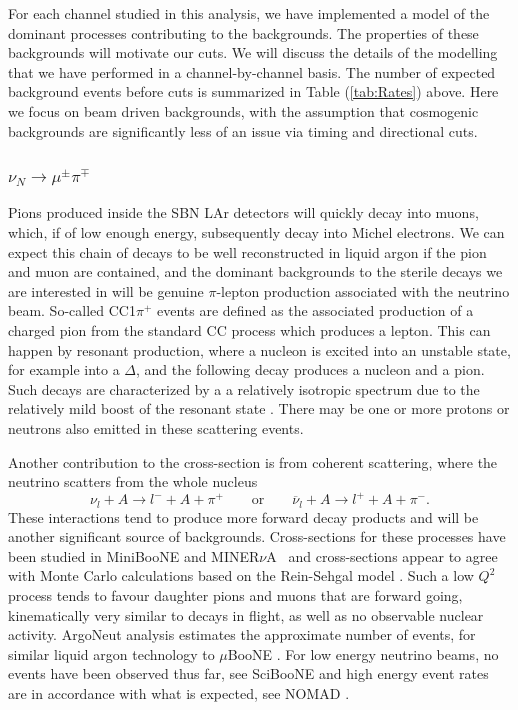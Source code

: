 \documentclass[11pt, a4paper]{article}
\def\minerva{MINER$\nu$A}
\begin{document}
For each channel studied in this analysis, we have implemented a model of the dominant processes contributing to the backgrounds. The properties of these backgrounds will motivate our cuts. We will discuss the details of the modelling that we have performed in a channel-by-channel basis. The number of expected background events before cuts is summarized in Table (\ref{tab:Rates}) above. Here we focus on beam driven backgrounds, with the assumption that cosmogenic backgrounds are significantly less of an issue via timing and directional cuts. 


\subsubsection{$\nu_N \rightarrow \mu^\pm \pi^\mp$ }

Pions produced inside the SBN LAr detectors will quickly decay into muons, which, if of low enough energy,
subsequently decay into Michel electrons. We can expect this chain of decays to
be well reconstructed in liquid argon if the pion and muon are contained, and the dominant backgrounds to the
sterile decays we are interested in will be genuine $\pi$-lepton production
associated with the neutrino beam. So-called CC1$\pi^+$ events are defined as
the associated production of a charged pion from the standard CC process which
produces a lepton. This can happen by resonant production, where a nucleon is
excited into an unstable state, for example into a $\Delta$, and the following
decay produces a nucleon and a pion. Such decays are characterized by a
a relatively isotropic spectrum due to the relatively mild boost of the resonant state
\cite{Rein:1982pf}. There may be one or more protons or neutrons also emitted in these scattering events. 

Another contribution to the cross-section is from coherent
scattering, where the neutrino scatters from the whole nucleus 
%
\[   \nu_l + A \to l^- + A + \pi^+ \qquad\text{or}\qquad \overline{\nu}_l + A
\to l^+ + A + \pi^-. \]
%
These interactions tend to produce more forward decay products and will be another significant source of backgrounds. Cross-sections for these processes have been studied in MiniBooNE \cite{Wascko:2006tx} and \minerva\ \cite{Eberly:2014mra} and cross-sections appear to agree with Monte Carlo calculations based on the Rein-Sehgal model \cite{Rein:2006di, Rein:1982pf}. Such a low $Q^2$ process tends to favour daughter pions and muons that are forward going, kinematically very similar to decays in flight, as well as no observable nuclear activity. ArgoNeut analysis estimates the approximate number of events, for similar liquid argon technology to $\mu$BooNE \cite{Acciarri:2014eit}. For low energy neutrino beams, no events have been observed thus far, see SciBooNE \cite{Tanaka:2009ag} and high energy event rates are in accordance with what is expected, see NOMAD \cite{Kullenberg:2009pu}.
\end{document}
